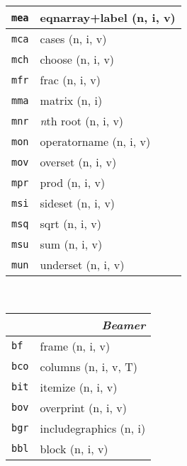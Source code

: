 \documentclass[oneside,10pt,landscape,DIV16]{scrartcl}
\newcommand{\Map}[1] {\textbf{\textasciiacute}\texttt{#1}}
\begin{document}
\begin{multicols}{3}
\begin{center}
\begin{tabular}[]{|p{11mm}|p{62mm}|}
\hline  \Map{mea} & eqnarray+label            \hfill (n, i, v)\\
\hline
\hline  \Map{mca} & cases                     \hfill (n, i, v)\\
\hline  \Map{mch} & choose                    \hfill (n, i, v)\\
\hline  \Map{mfr} & frac                      \hfill (n, i, v)\\
\hline  \Map{mma} & matrix                    \hfill (n, i)\\
\hline  \Map{mnr} & \textit{n}th root         \hfill (n, i, v)\\
\hline  \Map{mon} & operatorname              \hfill (n, i, v)\\
\hline  \Map{mov} & overset                   \hfill (n, i, v)\\
\hline  \Map{mpr} & prod                      \hfill (n, i, v)\\
\hline  \Map{msi} & sideset                   \hfill (n, i, v)\\
\hline  \Map{msq} & sqrt                      \hfill (n, i, v)\\
\hline  \Map{msu} & sum                       \hfill (n, i, v)\\
\hline  \Map{mun} & underset                  \hfill (n, i, v)\\
\hline
%
\end{tabular}\\
%
\newpage
%
\begin{tabular}[]{|p{11mm}|p{60mm}|}
\hline
\multicolumn{2}{|r|}{\textsl{B\textbf{e}amer}}\\[1.0ex]
\hline \Map{bf}  & frame           \hfill (n, i, v)\\
\hline \Map{bco} & columns         \hfill (n, i, v, T)\\
\hline \Map{bit} & itemize         \hfill (n, i, v)\\
\hline \Map{bov} & overprint       \hfill (n, i, v)\\
\hline \Map{bgr} & includegraphics \hfill (n, i)\\
\hline \Map{bbl} & block           \hfill (n, i, v)\\

\end{tabular}
\end{center}
\end{multicols}
\end{document}
